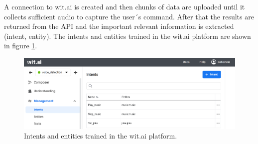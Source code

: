 A connection to wit.ai is created and then chunks of data are uploaded until it collects sufficient audio to capture the user´s command. After that the results are returned from the API and the important relevant information is extracted (intent, entity). The intents and entities trained in the wit.ai platform are shown in figure \ref{fig:WitAI}.

\begin{figure}[H]
    \centering
    \includegraphics[width=1\textwidth]{Images/witai.png}
    \caption{Intents and entities trained in the wit.ai platform.}
    \label{fig:WitAI}
\end{figure}



